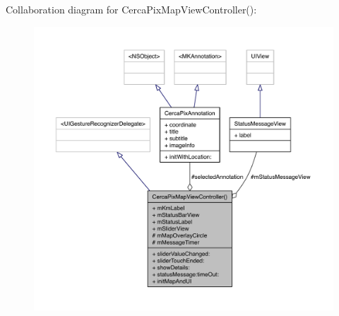 Collaboration diagram for Cerca\-Pix\-Map\-View\-Controller()\-:\nopagebreak
\begin{figure}[H]
\begin{center}
\leavevmode
\includegraphics[width=350pt]{category_cerca_pix_map_view_controller_07_08__coll__graph}
\end{center}
\end{figure}

